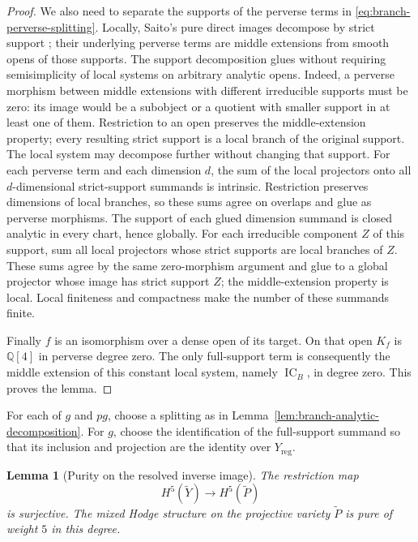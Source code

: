 \documentclass[11pt]{amsart}
\newtheorem{lemma}[theorem]{Lemma}
\theoremstyle{definition}
\theoremstyle{remark}
\numberwithin{equation}{section}
\newcommand{\Q}{\mathbb{Q}}
\DeclareMathOperator{\IC}{IC}
\begin{document}
\begin{proof}
We also need to separate the supports of the perverse terms in
\eqref{eq:branch-perverse-splitting}.  Locally, Saito's pure
direct images decompose by strict support
\cite[Section~5.1 and Theorem~5.3.1]{SaitoMHP}; their underlying
perverse terms are middle extensions from smooth opens of those
supports.  The support decomposition glues without requiring
semisimplicity of local systems on arbitrary analytic opens.  Indeed,
a perverse morphism between middle extensions with different
irreducible supports must be zero: its image would be a subobject or
a quotient with smaller support in at least one of them.  Restriction
to an open preserves the middle-extension property; every resulting
strict support is a local branch of the original support.  The local
system may decompose further without changing that support.  For each
perverse term and each dimension $d$, the sum of the local projectors
onto all $d$-dimensional strict-support summands is intrinsic.
Restriction preserves dimensions of local branches, so these sums
agree on overlaps and glue as perverse morphisms.  The support of each
glued dimension summand is closed analytic in every chart, hence
globally.  For each irreducible component $Z$ of this support, sum all
local projectors whose strict supports are local branches of $Z$.
These sums agree by the same zero-morphism argument and glue to a
global projector whose image has strict support $Z$; the
middle-extension property is local.  Local finiteness and compactness
make the number of these summands finite.

Finally $f$ is an isomorphism over a dense open of its target.  On
that open $K_f$ is $\Q[4]$ in perverse degree zero.  The only
full-support term is consequently the middle extension of this
constant local system, namely $\IC_B$, in degree zero.  This proves
the lemma.
\end{proof}

For each of $g$ and $pg$, choose a splitting as in
Lemma~\ref{lem:branch-analytic-decomposition}.  For $g$, choose the
identification of the full-support summand so that its inclusion and
projection are the identity over $Y_{\mathrm{reg}}$.

\begin{lemma}[Purity on the resolved inverse image]
\label{lem:branch-resolved-purity}
The restriction map
\[
 H^5(\widetilde Y)\longrightarrow H^5(\widetilde P)
\]
is surjective.  The mixed Hodge structure on the projective variety
$\widetilde P$ is pure of weight $5$ in this degree.
\end{lemma}
\end{document}
